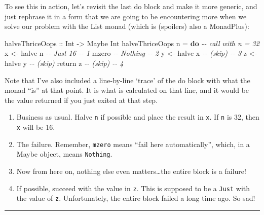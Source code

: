 \documentclass[]{article}
\newenvironment{Shaded}{}{}
\newcommand{\CommentTok}[1]{\textcolor[rgb]{0.38,0.63,0.69}{\textit{#1}}}
\newcommand{\DataTypeTok}[1]{\textcolor[rgb]{0.56,0.13,0.00}{#1}}
\newcommand{\FunctionTok}[1]{\textcolor[rgb]{0.02,0.16,0.49}{#1}}
\newcommand{\KeywordTok}[1]{\textcolor[rgb]{0.00,0.44,0.13}{\textbf{#1}}}
\newcommand{\NormalTok}[1]{#1}
\newcommand{\OtherTok}[1]{\textcolor[rgb]{0.00,0.44,0.13}{#1}}
\begin{document}
To see this in action, let's revisit the last do block and make it more generic,
and just rephrase it in a form that we are going to be encountering more when we
solve our problem with the List monad (which is (spoilers) also a MonadPlus):

\begin{Shaded}
\begin{Highlighting}[]
\OtherTok{halveThriceOops ::} \DataTypeTok{Int} \OtherTok{{-}>} \DataTypeTok{Maybe} \DataTypeTok{Int}
\NormalTok{halveThriceOops n }\OtherTok{=} \KeywordTok{do}          \CommentTok{{-}{-} call with n = 32}
\NormalTok{    x }\OtherTok{<{-}}\NormalTok{ halve n                }\CommentTok{{-}{-} Just 16              {-}{-} 1}
\NormalTok{    mzero                       }\CommentTok{{-}{-} Nothing              {-}{-} 2}
\NormalTok{    y }\OtherTok{<{-}}\NormalTok{ halve x                }\CommentTok{{-}{-} (skip)               {-}{-} 3}
\NormalTok{    z }\OtherTok{<{-}}\NormalTok{ halve y                }\CommentTok{{-}{-} (skip)}
    \FunctionTok{return}\NormalTok{ z                    }\CommentTok{{-}{-} (skip)               {-}{-} 4}
\end{Highlighting}
\end{Shaded}

Note that I've also included a line-by-line `trace' of the do block with what
the monad ``is'' at that point. It is what is calculated on that line, and it
would be the value returned if you just exited at that step.

\begin{enumerate}
\def\labelenumi{\arabic{enumi}.}
\tightlist
\item
  Business as usual. Halve \texttt{n} if possible and place the result in
  \texttt{x}. If \texttt{n} is 32, then \texttt{x} will be 16.
\item
  The failure. Remember, \texttt{mzero} means ``fail here automatically'',
  which, in a Maybe object, means \texttt{Nothing}.
\item
  Now from here on, nothing else even matters\ldots the entire block is a
  failure!
\item
  If possible, succeed with the value in \texttt{z}. This is supposed to be a
  \texttt{Just} with the value of \texttt{z}. Unfortunately, the entire block
  failed a long time ago. So sad!
\end{enumerate}

\begin{center}\rule{0.5\linewidth}{\linethickness}\end{center}
\end{document}

